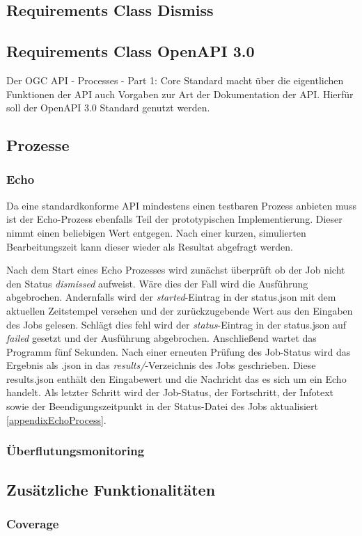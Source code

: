 \subsection{Requirements Class Dismiss}
\subsection{Requirements Class OpenAPI 3.0}
Der OGC API - Processes - Part 1: Core Standard macht über die eigentlichen Funktionen der API auch Vorgaben zur Art der Dokumentation der API. Hierfür soll der 
OpenAPI 3.0 Standard genutzt werden. 
\subsection{Prozesse}
\subsubsection{Echo}
Da eine standardkonforme API mindestens einen testbaren Prozess anbieten muss ist der Echo-Prozess ebenfalls Teil der prototypischen Implementierung. 
Dieser nimmt einen beliebigen Wert entgegen. Nach einer kurzen, simulierten Bearbeitungszeit kann dieser wieder als Resultat abgefragt werden. 

Nach dem Start eines Echo Prozesses wird zunächst überprüft ob der Job nicht den Status \textit{dismissed} aufweist. Wäre dies der Fall wird die Ausführung abgebrochen. 
Andernfalls wird der \textit{started}-Eintrag in der status.json mit dem aktuellen Zeitstempel versehen und der zurückzugebende Wert aus den Eingaben des Jobs gelesen.
Schlägt dies fehl wird der \textit{status}-Eintrag in der status.json auf \textit{failed} gesetzt und der Ausführung abgebrochen. 
Anschließend wartet das Programm fünf Sekunden. Nach einer erneuten Prüfung des Job-Status wird das Ergebnis als .json in das \textit{results/}-Verzeichnis des Jobs geschrieben.
Diese results.json enthält den Eingabewert und die Nachricht das es sich um ein Echo handelt. 
Als letzter Schritt wird der Job-Status, der Fortschritt, der Infotext sowie der Beendigungszeitpunkt in der Status-Datei des Jobs aktualisiert \ref{appendixEchoProcess}. 

\subsubsection{Überflutungsmonitoring}
\subsection{Zusätzliche Funktionalitäten}
\subsubsection{Coverage} 